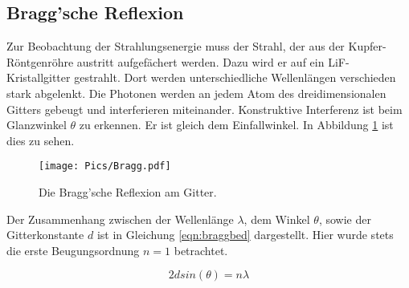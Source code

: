 \subsection{Bragg'sche Reflexion}

Zur Beobachtung der Strahlungsenergie muss der Strahl, der aus der Kupfer-Röntgenröhre
austritt aufgefächert werden. Dazu wird er auf ein LiF-Kristallgitter gestrahlt. Dort
werden unterschiedliche Wellenlängen verschieden stark abgelenkt. Die Photonen werden
an jedem Atom des dreidimensionalen Gitters gebeugt und interferieren miteinander.
Konstruktive Interferenz ist beim Glanzwinkel $\theta$ zu erkennen. Er ist gleich
dem Einfallwinkel. In Abbildung \ref{fig:bragg} ist dies zu sehen.

\begin{figure}
  \centering
  \texttt{[image: Pics/Bragg.pdf]}
  \caption{Die Bragg'sche Reflexion am Gitter. \cite{anleitung}}
  \label{fig:bragg}
\end{figure}

Der Zusammenhang zwischen der Wellenlänge $\lambda$, dem Winkel $\theta$, sowie der
Gitterkonstante $d$ ist in Gleichung \eqref{eqn:braggbed} dargestellt. Hier wurde
stets die erste Beugungsordnung $n=1$ betrachtet.

\begin{equation}
  2 d sin(\theta) = n \lambda
  \label{eqn:braggbed}
\end{equation}
